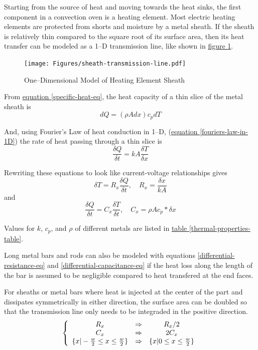 \documentclass[10pt, twocolumn]{article}
\begin{document}
Starting from the source of heat and moving towards the heat sinks,
the first component in a convection oven is a heating element.
Most electric heating elements are protected from shorts and moisture
by a metal sheath.
If the sheath is relatively thin compared to the square root of its surface area,
then its heat transfer can be modeled as a 1--D transmission line, like shown in
\hyperref[sheath-transmission-line]{figure \ref{sheath-transmission-line}}.

\begin{figure}
\centering
\texttt{[image: Figures/sheath-transmission-line.pdf]}
\caption{One--Dimensional Model of Heating Element Sheath}
\label{sheath-transmission-line}
\end{figure}

From \hyperref[specific-heat-eq]{equation \ref{specific-heat-eq}},
the heat capacity of a thin slice of the metal sheath is
\begin{equation*}
dQ=(\rho A dx)c_{p}dT
\end{equation*}

And, using Fourier's Law of heat conduction in 1--D,
(\hyperref[fouriers-law-in-1D]{equation \ref{fouriers-law-in-1D}})
the rate of heat passing through a thin slice is
\begin{equation*}
\frac{\delta Q}{\delta t}=kA\frac{\delta T}{\delta x}
\end{equation*} 
 
Rewriting these equations to look like current-voltage relationships gives
\begin{equation}
\delta T=R_{x}\frac{\delta Q}{\delta t},
\quad R_{x}=\frac{\delta x}{kA}
\label{differential-resistance-eq}
\end{equation}
and
\begin{equation}
\frac{\delta Q}{\delta t}=C_{x}\frac{\delta T}{\delta t},
\quad C_{x}=\rho A c_{p} * \delta x
\label{differential-capacitance-eq}
\end{equation}

Values for $k$, $c_{p}$, and $\rho$ of different metals are listed in
\hyperref[thermal-properties-table]{table \ref{thermal-properties-table}}.

Long metal bars and rods can also be modeled with equations
\ref{differential-resistance-eq} and \ref{differential-capacitance-eq}
if the heat loss along the length of the bar is assumed to be
negligible compared to heat transfered at the end faces.

For sheaths or metal bars where heat is injected at the center
of the part and dissipates symmetrically in either direction,
the surface area can be doubled so that the transmission line
only needs to be integraded in the positive direction.
\begin{equation}
\left\{\begin{array}{c c c}
R_{x}	&\Rightarrow	&R_{x}/{2}	\\
C_{x}	&\Rightarrow	&2C_{x}	\\
\{x|-\frac{w}{2} \leq x \leq \frac{w}{2}\}	&\Rightarrow	&\{x|0 \leq x \leq \frac{w}{2}\}	\\
\end{array}\right.
\end{equation}
\end{document}
